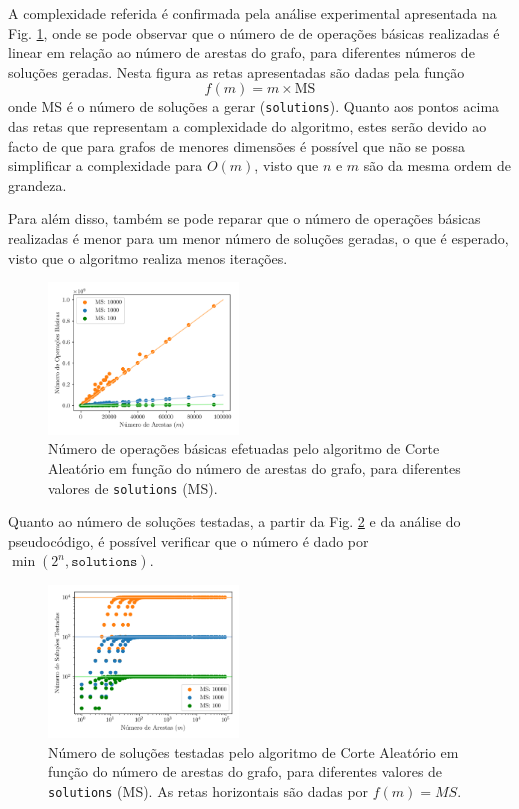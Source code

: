 \documentclass[mirror, portugues]{revdetua}
\begin{document}
A complexidade referida é confirmada pela análise experimental apresentada na Fig. \ref{fig:random_ops}, onde se pode observar que o número de de operações básicas realizadas é linear em relação ao número de arestas do grafo, para diferentes números de soluções geradas. Nesta figura as retas apresentadas são dadas pela função $$f(m) = m \times \text{MS}$$ onde MS é o número de soluções a gerar (\texttt{solutions}). Quanto aos pontos acima das retas que representam a complexidade do algoritmo, estes serão devido ao facto de que para grafos de menores dimensões é possível que não se possa simplificar a complexidade para $O(m)$, visto que $n$ e $m$ são da mesma ordem de grandeza.

Para além disso, também se pode reparar que o número de operações básicas realizadas é menor para um menor número de soluções geradas, o que é esperado, visto que o algoritmo realiza menos iterações.

\begin{figure}[H]
    \centering
    \includegraphics[width=0.45\textwidth]{../assets/ops_Random Sol.png}
    \caption{Número de operações básicas efetuadas pelo algoritmo de Corte Aleatório em função do número de arestas do grafo, para diferentes valores de \texttt{solutions} (MS).}
    \label{fig:random_ops}
\end{figure}

Quanto ao número de soluções testadas, a partir da Fig. \ref{fig:sols_randomrandom} e da análise do pseudocódigo, é possível verificar que o número é dado por $\min(2^n, \texttt{solutions})$.

\begin{figure}[H]
    \centering
    \includegraphics[width=0.45\textwidth]{../assets/sols_Random Sol.png}
    \caption{Número de soluções testadas pelo algoritmo de Corte Aleatório em função do número de arestas do grafo, para diferentes valores de \texttt{solutions} (MS). As retas horizontais são dadas por $f(m) = MS$.}
    \label{fig:sols_randomrandom}
\end{figure}
\end{document}
